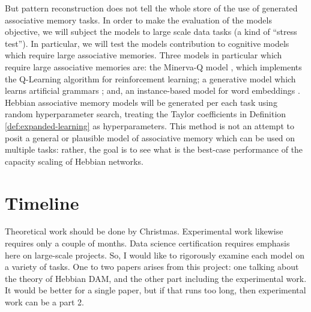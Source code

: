 \documentclass{article}
\theoremstyle{definition}
\begin{document}
But pattern reconstruction does not tell the whole store of the use of
generated associative memory tasks. In order to make the evaluation of
the models objective, we will subject the models to large scale data
tasks (a kind of ``stress test''). In particular, we will test the models
contribution to cognitive models which require large associative memories.
Three models in particular which require large associative memories are:
the Minerva-Q model \parencite{ozen_minerva-q_2022}, which implements
the Q-Learning algorithm for reinforcement learning; a
generative model which learns artificial grammars
\parencite{johns_generating_2015};
and, an instance-based model for word embeddings
\parencite{jamieson_instance_2018}.
Hebbian associative memory models will be generated per each task using
random hyperparameter search, treating the Taylor coefficients in
Definition \ref{def:expanded-learning} as hyperparameters. This method
is not an attempt to posit a general or plausible model of associative
memory which can be used on multiple tasks: rather, the goal is to
see what is the best-case performance of the capacity scaling
of Hebbian networks.


\section{Timeline}\label{sec:timeline}

Theoretical work should be done by Christmas. Experimental work likewise
requires only a couple of months. Data science certification requires emphasis
here on large-scale projects. So, I would like to rigorously examine
each model on a variety of tasks. One to two papers arises from this project:
one talking about the theory of Hebbian DAM, and the other part including
the experimental work. It would be better for a single paper, but if that
runs too long, then experimental work can be a part 2.

\printbibliography
\end{document}
